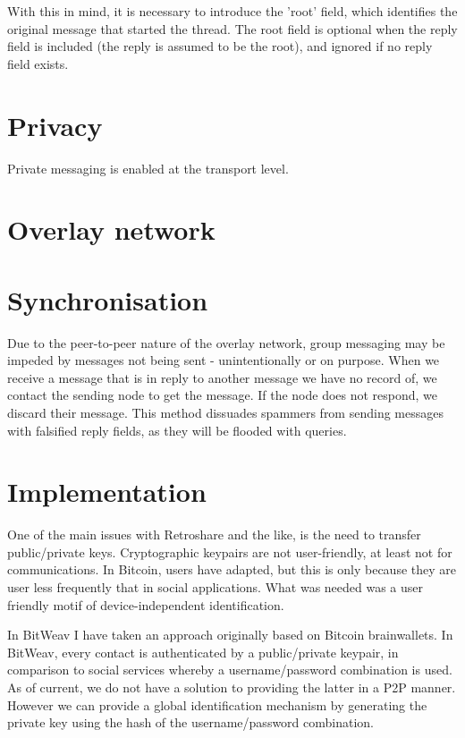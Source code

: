 \documentclass[10pt,a4paper,onecolumn]{article}
\begin{document}
With this in mind, it is necessary to introduce the 'root' field, which identifies the original message that started the thread. The root field is  optional when the reply field is included (the reply is assumed to be the root), and ignored if no reply field exists. 

\section{Privacy}
Private messaging is enabled at the transport level. 

\section{Overlay network}
\iffalse
https://code.google.com/p/skademlia/
https://research.microsoft.com/en-us/um/people/antr/PAST/scribe.pdf
http://www.cs.toronto.edu/iptps2008/final/70.pdf
https://en.wikipedia.org/wiki/Tapestry_(DHT)
\fi
\section{Synchronisation}
Due to the peer-to-peer nature of the overlay network, group messaging may be impeded by messages not being sent - unintentionally or on purpose. When we receive a message that is in reply to another message we have no record of, we contact the sending node to get the message. If the node does not respond, we discard their message. This method dissuades spammers from sending messages with falsified reply fields, as they will be flooded with queries. 

\section{Implementation}
One of the main issues with Retroshare and the like, is the need to transfer public/private keys. Cryptographic keypairs are not user-friendly, at least not for communications. In Bitcoin, users have adapted, but this is only because they are user less frequently that in social applications. What was needed was a user friendly motif of device-independent identification. 

In BitWeav I have taken an approach originally based on Bitcoin brainwallets. In BitWeav, every contact is authenticated by a public/private keypair, in comparison to social services whereby a username/password combination is used. As of current, we do not have a solution to providing the latter in a P2P manner. However we can provide a global identification mechanism by generating the private key using the hash of the username/password combination. 
\end{document}
